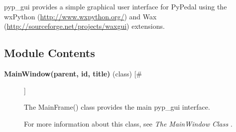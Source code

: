 

 pyp\_gui provides a simple graphical user interface for PyPedal using the wxPython (\url{http://www.wxpython.org/}) and Wax (\url{http://sourceforge.net/projects/waxgui}) extensions.
\subsection*{Module Contents}
\begin{description}
\item[\textbf{MainWindow(parent, id, title)}
 (class) [\#]]

 The MainFrame() class provides the main pyp\_gui interface.


 For more information about this class, see \emph{The MainWindow Class}
.


\end{description}
